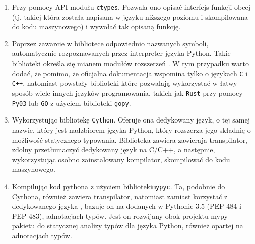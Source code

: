 \documentclass[10pt, a4paper]{article}
\newcommand{\code}[1]{\texttt{#1}}
\begin{document}
\begin{sloppypar}
    \begin{enumerate}
      \item Przy pomocy API modułu \code{ctypes}\cite{Python_ctypes}. Pozwala ono opisać
        interfejs funkcji obcej (tj. takiej która została napisana w języku niższego
        poziomu i skompilowana do kodu maszynowego) i wywołać tak opisaną funkcję.

      \item Poprzez zawarcie w bibliotece odpowiednio nazwanych symboli, automatycznie
        rozpoznawanych przez interpreter języka Python. Takie biblioteki określa się mianem
        modułów rozszerzeń \cite{Extending_Python_With_C_Cpp}. W tym przypadku warto
        dodać, że pomimo, że oficjalna dokumentacja wspomina tylko o językach \code{C} i
        \code{C++}, natomiast powstały biblioteki które pozwalają wykorzystać w łatwy sposób
        wiele innych języków programowania, takich jak \code{Rust} przy pomocy \code{Py03}\cite{PyO3}
        lub \code{GO} z użyciem biblioteki \code{gopy}\cite{gopy}.

      \item Wykorzystując bibliotekę \code{Cython}\cite{Cython_Org}\cite{Cython_The_Best_Of_Both}.
        Oferuje ona dedykowany język, o tej samej nazwie, który jest nadzbiorem języka Python,
        który rozszerza jego składnię o możliwość statycznego typowania. Biblioteka zawiera
        zawieraja transpilator, zdolny przetłumaczyć dedykowany język na C/C++, a następnie,
        wykorzystując osobno zainstalowany kompilator, skompilować do kodu maszynowego.


      \item Kompilując kod pythona z użyciem biblioteki\code{mypyc}\cite{mypyc}. Ta,
        podobnie do Cythona, również zawiera transpilator, natomiast zamiast korzystać z
        dedykowanego języka , bazuje on na dodanych w Pythonie 3.5\cite{Python_3_5} (PEP
        484\cite{PEP_484} i PEP 483\cite{PEP_483}), adnotacjach typów. Jest on rozwijany
        obok projektu mypy - pakietu do statycznej analizy typów dla języka Python,
        również opartej na adnotacjach typów\cite{mypy}.
    \end{enumerate}


\end{sloppypar}
\end{document}
